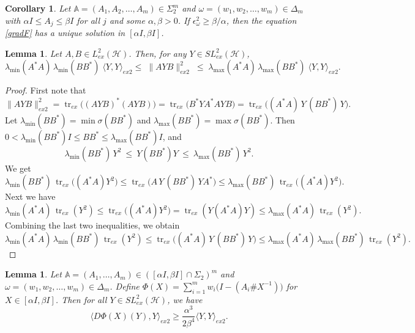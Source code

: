 \documentclass[12pt,reqno]{amsart}
\newtheorem{corollary}[theorem]{Corollary}
\newtheorem{lemma}[theorem]{Lemma}
\DeclareMathOperator{\tr}{\mathrm{tr}}
\begin{document}
\begin{corollary}\label{corl}
Let $\mathbb{A } =(A_1, A_2, \ldots, A_m) \in \Sigma_2^{m}$ and $\omega = (w_{1}, w_{2}, \dots, w_{m}) \in \Delta_{m}$ with $\alpha I \leq A_j \leq \beta I$ for all $j$ and some $\alpha, \beta > 0$. If $\epsilon_{\omega}^2 \geq \beta / \alpha$, then the equation \eqref{gradF} has a unique solution in $[\alpha I, \beta I ]$.
\end{corollary}

\begin{lemma}\label{l-1}
Let $A,B\in L^2_{ex}(\mathcal{H})$. Then, for any  $Y \in SL^{2}_{ex} (\mathcal{H})$,
\[
 \lambda_{\min}(A^*A)\,\lambda_{\min}(BB^*)\;
 \langle Y, Y \rangle_{ex2}\le\;
 \| A Y B\|_{ex2}^2
 \;\le\;
 \lambda_{\max}(A^*A)\,\lambda_{\max}(BB^*)\;\langle Y, Y \rangle_{ex2}.
\]
\end{lemma}


\begin{proof}
First note that
\[
\| AYB \|_{ex2}^{2}
= \tr_{ex} \big( (AYB)^* (AYB) \big)
= \tr_{ex} \big(B^* Y A^* A Y B \big)
= \tr_{ex} \big( (A^*A) \, Y \, (BB^*) \, Y \big).
\]
Let
$
\lambda_{\min}(BB^*)=\min\sigma(BB^*)$ and
$\lambda_{\max}(BB^*)=\max\sigma(BB^*)$. Then $0<\lambda_{\min}(BB^*)I\le BB^*\le \lambda_{\max}(BB^*)I$,
and
$$
\lambda_{\min}(BB^*)\,Y^{2}\ \le\ Y(BB^*)Y\ \le\ \lambda_{\max}(BB^*)\,Y^{2}.$$
We get
\[
\lambda_{\min}(BB^*) \, \tr_{ex} \big( (A^*A) Y^{2} \big)
\le \tr_{ex} \big( A \, Y \, (BB^*) \, Y A^* \big)
\le \lambda_{\max}(BB^*) \, \tr_{ex} \big( (A^*A) Y^{2} \big).
\]
Next we have
\[
\lambda_{\min}(A^*A) \, \tr_{ex}(Y^{2})
\le \tr_{ex} \big( (A^*A) Y^{2} \big) = \tr_{ex}(Y(A^*A)Y)
\le \lambda_{\max}(A^*A) \, \tr_{ex}(Y^{2}).
\]
Combining the last two inequalities, we obtain
\[
\lambda_{\min}(A^*A)\,\lambda_{\min}(BB^*)\,\tr_{ex}(Y^{2})
\le \tr_{ex}\!\big((A^*A)\,Y\,(BB^*)\,Y\big)
\le \lambda_{\max}(A^*A)\,\lambda_{\max}(BB^*)\,\tr_{ex}(Y^{2}).
\]
\end{proof}



\begin{lemma} \label{L:Phi-bdd}
Let $\mathbb{A} = (A_1, \ldots, A_m) \in ([\alpha I, \beta I] \cap \Sigma_2)^m$ and $\omega = (w_{1}, w_{2}, \dots, w_{m}) \in \Delta_{m}$. Define $\displaystyle \Phi(X) =  \sum_{i=1}^{m} w_i  \big(I - (A_i \# X^{-1}) \big)$ for $X \in [\alpha I, \beta I]$. Then for all $Y \in SL^{2}_{ex} (\mathcal{H})$, we have
\[
\langle D\Phi(X)(Y), Y \rangle_{ex2} \geq \frac{\alpha^3}{2\beta^4} \langle Y, Y \rangle_{ex2}.
\]
\end{lemma}
\end{document}
